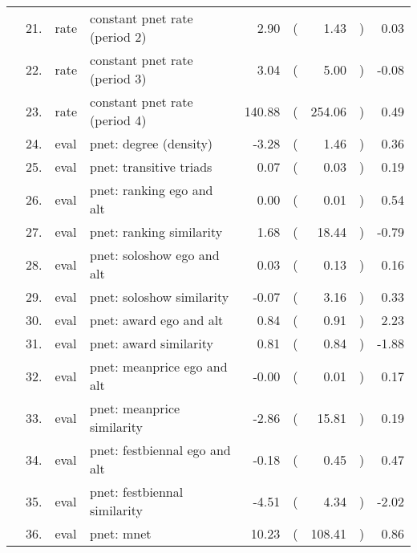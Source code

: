 \begin{table}[ht]
\begin{tabular}{llllrlrlr}
    & 21. & rate & constant pnet rate (period 2) & 2.90 & ( & 1.43 & ) & 0.03 \\ 
    & 22. & rate & constant pnet rate (period 3) & 3.04 & ( & 5.00 & ) & -0.08 \\ 
    & 23. & rate & constant pnet rate (period 4) & 140.88 & ( & 254.06 & ) & 0.49 \\ 
    & 24. & eval & pnet: degree (density) & -3.28 & ( & 1.46 & ) & 0.36 \\ 
    & 25. & eval & pnet: transitive triads & 0.07 & ( & 0.03 & ) & 0.19 \\ 
    & 26. & eval & pnet: ranking ego and alt & 0.00 & ( & 0.01 & ) & 0.54 \\ 
    & 27. & eval & pnet: ranking similarity & 1.68 & ( & 18.44 & ) & -0.79 \\ 
    & 28. & eval & pnet: soloshow ego and alt & 0.03 & ( & 0.13 & ) & 0.16 \\ 
    & 29. & eval & pnet: soloshow similarity & -0.07 & ( & 3.16 & ) & 0.33 \\ 
    & 30. & eval & pnet: award ego and alt & 0.84 & ( & 0.91 & ) & 2.23 \\ 
    & 31. & eval & pnet: award similarity & 0.81 & ( & 0.84 & ) & -1.88 \\ 
    & 32. & eval & pnet: meanprice ego and alt & -0.00 & ( & 0.01 & ) & 0.17 \\ 
    & 33. & eval & pnet: meanprice similarity & -2.86 & ( & 15.81 & ) & 0.19 \\ 
    & 34. & eval & pnet: festbiennal ego and alt & -0.18 & ( & 0.45 & ) & 0.47 \\ 
    & 35. & eval & pnet: festbiennal similarity & -4.51 & ( & 4.34 & ) & -2.02 \\ 
    & 36. & eval & pnet: mnet & 10.23 & ( & 108.41 & ) & 0.86 \\ 
   \hline
\end{tabular}
\end{table}
